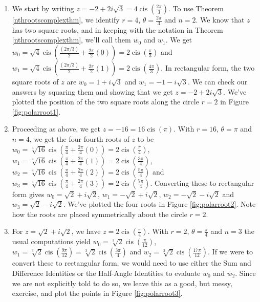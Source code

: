{
\begin{enumerate}

\item  We start by writing $z= - 2 + 2i\sqrt{3} = 4 \operatorname{cis}\left(\frac{2\pi}{3}\right)$.  To use Theorem \ref{nthrootscomplexthm}, we identify $r =4$,  $\theta = \frac{2\pi}{3}$ and $n=2$.  We know that $z$ has two square roots, and in keeping with the notation in Theorem \ref{nthrootscomplexthm}, we'll call them  $w_{0}$ and $w_{1}$.  We get $w_{0} = \sqrt{4} \operatorname{cis}\left(\frac{(2\pi/3)}{2} + \frac{2\pi}{2} (0)\right) = 2\operatorname{cis}\left(\frac{\pi}{3}\right)$ and $w_{1} = \sqrt{4} \operatorname{cis}\left(\frac{(2\pi/3)}{2} + \frac{2\pi}{2} (1)\right) = 2\operatorname{cis}\left(\frac{4\pi}{3}\right)$.  In rectangular form, the two square roots of $z$ are $w_{0} = 1+i\sqrt{3}$ and $w_{1} = -1-i\sqrt{3}$.  We can check our answers by squaring them and showing that we get $z= -2 + 2i\sqrt{3}$. We've plotted the position of the two square roots along the circle $r=2$ in Figure \ref{fig:polarroot1}.


\item  Proceeding as above, we get $z = -16 = 16 \operatorname{cis}(\pi)$.  With $r = 16$, $\theta = \pi$ and $n = 4$, we get the four fourth roots of $z$ to be  $w_{0} = \sqrt[4]{16} \operatorname{cis}\left(\frac{\pi}{4} + \frac{2\pi}{4} (0)\right) = 2\operatorname{cis}\left(\frac{\pi}{4}\right)$, $w_{1} = \sqrt[4]{16} \operatorname{cis}\left(\frac{\pi}{4} + \frac{2\pi}{4} (1)\right) = 2\operatorname{cis}\left(\frac{3\pi}{4}\right)$, $w_{2} = \sqrt[4]{16} \operatorname{cis}\left(\frac{\pi}{4} + \frac{2\pi}{4} (2)\right) = 2\operatorname{cis}\left(\frac{5\pi}{4}\right)$ and $w_{3} = \sqrt[4]{16} \operatorname{cis}\left(\frac{\pi}{4} + \frac{2\pi}{4} (3)\right) = 2\operatorname{cis}\left(\frac{7\pi}{4}\right)$.  Converting these to rectangular form gives $w_{0} = \sqrt{2} + i\sqrt{2}$,  $w_{1} = -\sqrt{2} + i\sqrt{2}$,  $w_{2} = -\sqrt{2} - i\sqrt{2}$ and  $w_{3} = \sqrt{2} - i\sqrt{2}$. We've plotted the four roots in Figure \ref{fig:polarroot2}. Note how the roots are placed symmetrically about the circle $r=2$.


\item  For $z = \sqrt{2} + i \sqrt{2}$, we have $z = 2\operatorname{cis}\left(\frac{\pi}{4}\right)$.  With $r = 2$, $\theta = \frac{\pi}{4}$ and $n =3$ the usual computations yield $w_{0} = \sqrt[3]{2} \operatorname{cis}\left(\frac{\pi}{12}\right)$,  $w_{1} = \sqrt[3]{2} \operatorname{cis}\left(\frac{9\pi}{12}\right) = \sqrt[3]{2} \operatorname{cis}\left(\frac{3\pi}{4}\right) $ and  $w_{2} = \sqrt[3]{2} \operatorname{cis}\left(\frac{17\pi}{12}\right)$.  If we were to  convert these to rectangular form, we would need to use either the Sum and Difference Identities or the Half-Angle Identities to evaluate $w_{0}$ and  $w_{2}$.  Since we are not explicitly told to do so, we leave this as a good, but messy, exercise, and plot the points in Figure \ref{fig:polarroot3}.


\end{enumerate}}
